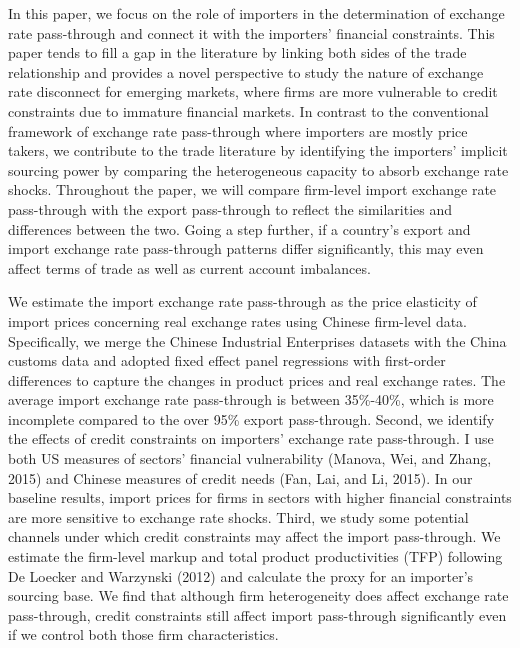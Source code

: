 In this paper, we focus on the role of importers in the determination of exchange rate pass-through and connect it with the importers' financial constraints. This paper tends to fill a gap in the literature by linking both sides of the trade relationship and provides a novel perspective to study the nature of exchange rate disconnect for emerging markets, where firms are more vulnerable to credit constraints due to immature financial markets. In contrast to the conventional framework of exchange rate pass-through where importers are mostly price takers, we contribute to the trade literature by identifying the importers' implicit sourcing power by comparing the heterogeneous capacity to absorb exchange rate shocks. Throughout the paper, we will compare firm-level import exchange rate pass-through with the export pass-through to reflect the similarities and differences between the two. Going a step further, if a country's export and import exchange rate pass-through patterns differ significantly, this may even affect terms of trade as well as current account imbalances.

We estimate the import exchange rate pass-through as the price elasticity of import prices concerning real exchange rates using Chinese firm-level data. Specifically, we merge the Chinese Industrial Enterprises datasets with the China customs data and adopted fixed effect panel regressions with first-order differences to capture the changes in product prices and real exchange rates. The average import exchange rate pass-through is between 35\%-40\%, which is more incomplete compared to the over 95\% export pass-through. Second, we identify the effects of credit constraints on importers' exchange rate pass-through. I use both US measures of sectors’ financial vulnerability (Manova, Wei, and Zhang, 2015\cite{manova-wei-zhang2015}) and Chinese measures of credit needs (Fan, Lai, and Li, 2015\cite{fan-li-yeaple2015}). In our baseline results, import prices for firms in sectors with higher financial constraints are more sensitive to exchange rate shocks. Third, we study some potential channels under which credit constraints may affect the import pass-through. We estimate the firm-level markup and total product productivities (TFP) following De Loecker and Warzynski (2012)\cite{dlw2012} and calculate the proxy for an importer's sourcing base. We find that although firm heterogeneity does affect exchange rate pass-through, credit constraints still affect import pass-through significantly even if we control both those firm characteristics. 

